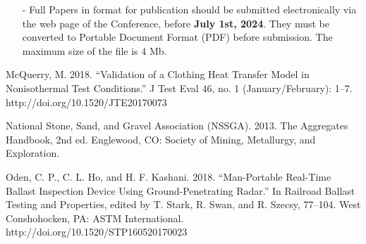 \documentclass[a4paper]{eccomas_paper-2024}
\begin{document}
\begin{itemize}
\item[-] Full Papers in format for publication should be submitted electronically via the web page of the Conference, before \textbf{July 1st, 2024}. They must be converted to  Portable Document Format (PDF) before submission. The maximum size of the file is 4 Mb.


\end{itemize}

\begin{thebibliography}{99}
  McQuerry, M. 2018. “Validation of a Clothing Heat Transfer Model in Nonisothermal Test Conditions.” J Test Eval 46, no. 1 (January/February): 1–7. http://doi.org/10.1520/JTE20170073

   National Stone, Sand, and Gravel Association (NSSGA). 2013. The Aggregates Handbook, 2nd ed. Englewood, CO: Society of Mining, Metallurgy, and Exploration.

  Oden, C. P., C. L. Ho, and H. F. Kashani. 2018. “Man-Portable Real-Time Ballast Inspection Device Using Ground-Penetrating Radar.” In Railroad Ballast Testing and Properties, edited by T. Stark, R. Swan, and R. Szecsy, 77–104. West Conshohocken, PA: ASTM International. http://doi.org/10.1520/STP160520170023

\end{thebibliography}
\end{document}
